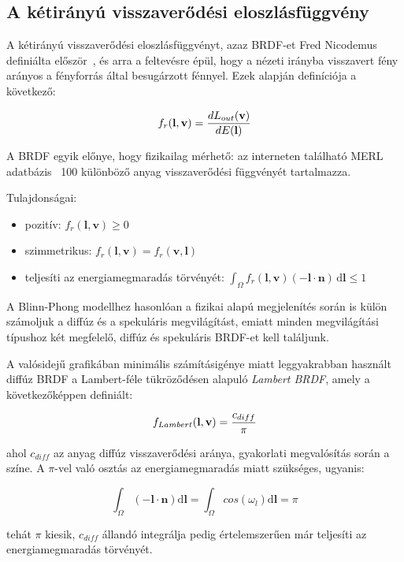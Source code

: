 \subsection{A kétirányú visszaverődési eloszlásfüggvény}

A kétirányú visszaverődési eloszlásfüggvényt, azaz BRDF-et Fred Nicodemus definiálta először~\cite{nicodemus1965directional}, és arra a feltevésre épül, hogy a nézeti irányba visszavert fény arányos a fényforrás által besugárzott fénnyel. Ezek alapján definíciója a következő:

\[
f_r(\mathbf{l}, \mathbf{v}) = { { dL_{out}(\mathbf{v}) } \over {dE(\mathbf{l})} }
\]

A BRDF egyik előnye, hogy fizikailag mérhető: az interneten található MERL adatbázis~\cite{merl_database} 100 különböző anyag visszaverődési függvényét tartalmazza.

Tulajdonságai:

\begin{itemize}[noitemsep]
\item pozitív: \(f_r(\mathbf{l},\mathbf{v}) \geq 0\)
\item szimmetrikus: \(f_r(\mathbf{l},\mathbf{v}) = f_r(\mathbf{v},\mathbf{l})\)
\item teljesíti az energiamegmaradás törvényét: \(\int_\Omega f_r(\mathbf{l},\mathbf{v}) (-\mathbf{l} \cdot \mathbf{n})\,\mathrm{d}\mathbf{l} \leq 1\)
\end{itemize}

A Blinn-Phong modellhez hasonlóan a fizikai alapú megjelenítés során is külön számoljuk a diffúz és a spekuláris megvilágítást, emiatt minden megvilágítási típushoz két megfelelő, diffúz és spekuláris BRDF-et kell találjunk.

A valósidejű grafikában minimális számításigénye miatt leggyakrabban használt diffúz BRDF a Lambert-féle tükröződésen alapuló \textit{Lambert BRDF}, amely a következőképpen definiált:

\[
f_{Lambert}(\mathbf{l}, \mathbf{v}) = { c_{diff} \over \pi }
\]

ahol \(c_{diff}\) az anyag diffúz visszaverődési aránya, gyakorlati megvalósítás során a színe. A \(\pi\)-vel való osztás az energiamegmaradás miatt szükséges, ugyanis:

\[
\int_\Omega { (-\mathbf{l} \cdot \mathbf{n}) \mathrm{d}\mathbf{l} } = \int_\Omega { cos(\omega_l) \mathrm{d}\mathbf{l} } = \pi
\]

tehát \(\pi\) kiesik, \(c_{diff}\) állandó integrálja pedig értelemszerűen már teljesíti az energiamegmaradás törvényét.

